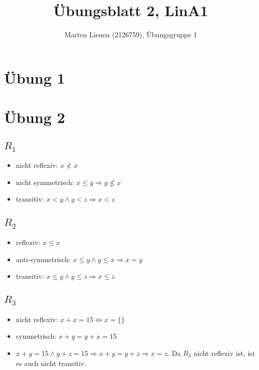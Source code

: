 \documentclass[a4paper,10pt]{article}
\title{Übungsblatt 2, LinA1}
\author{Marten Lienen (2126759), Übungsgruppe 1}
\begin{document}
\maketitle

\section*{Übung 1}



\section*{Übung 2}

\subsection*{$R_1$}

\begin{itemize}
 \item nicht reflexiv: $x \not< x$
 \item nicht symmetrisch: $x \le y \Rightarrow y \nleq x$
 \item transitiv: $x < y \land y < z \Rightarrow x < z$
\end{itemize}

\subsection*{$R_2$}

\begin{itemize}
 \item reflexiv: $x \le x$
 \item anti-symmetrisch: $x \le y \land y \le x \Rightarrow x = y$
 \item transitiv: $x \le y \land y \le z \Rightarrow x \le z$
\end{itemize}

\subsection*{$R_3$}

\begin{itemize}
 \item nicht reflexiv: $x + x = 15 \Leftrightarrow x = \{\}$
 \item symmetrisch: $x + y = y + x = 15$
 \item $x + y = 15 \land y + z = 15 \Rightarrow x + y = y + z \Rightarrow x = z$. Da $R_3$ nicht reflexiv ist, ist es auch nicht transitiv.
\end{itemize}
\end{document}
